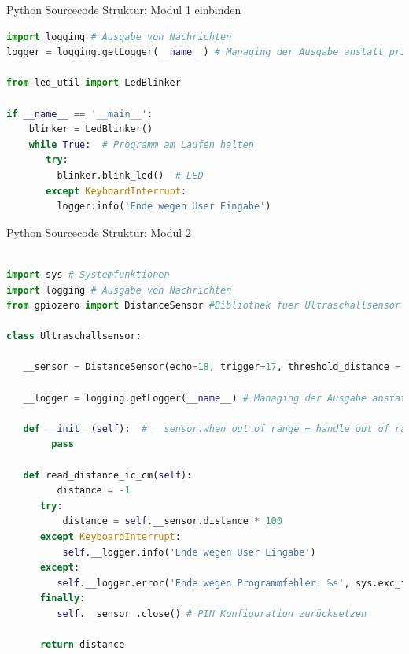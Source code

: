 \begin{frame}[fragile]{Python Sourcecode Struktur: Modul 1 einbinden}
\begin{lstlisting}[language=Python]
import logging # Ausgabe von Nachrichten
logger = logging.getLogger(__name__) # Managing der Ausgabe anstatt print() Funktion

from led_util import LedBlinker

if __name__ == '__main__':
    blinker = LedBlinker()
    while True:  # Programm am Laufen halten
       try:
         blinker.blink_led()  # LED
       except KeyboardInterrupt:
         logger.info('Ende wegen User Eingabe')

\end{lstlisting}
\end{frame}


\begin{frame}[fragile]{Python Sourcecode Struktur: Modul 2}
\begin{lstlisting}[language=Python]

import sys # Systemfunktionen
import logging # Ausgabe von Nachrichten
from gpiozero import DistanceSensor #Bibliothek fuer Ultraschallsensor

class Ultraschallsensor:

   __sensor = DistanceSensor(echo=18, trigger=17, threshold_distance = 0.1, max_distance=1) #  Sensor Kontrolle für GPIO PIN  Input 17 und Output 18 an private Variable zuweisen

   __logger = logging.getLogger(__name__) # Managing der Ausgabe anstatt print() Funktion

   def __init__(self):  # __sensor.when_out_of_range = handle_out_of_range # Funktion, die z.B. loggt
        pass

   def read_distance_ic_cm(self):
         distance = -1
      try:
          distance = self.__sensor.distance * 100
      except KeyboardInterrupt:
          self.__logger.info('Ende wegen User Eingabe')
      except:
         self.__logger.error('Ende wegen Programmfehler: %s', sys.exc_info()[0]) # siehe https://docs.python.org/3/tutorial/errors.html
      finally:
         self.__sensor .close() # PIN Konfiguration zurücksetzen

      return distance

\end{lstlisting}
\end{frame}

